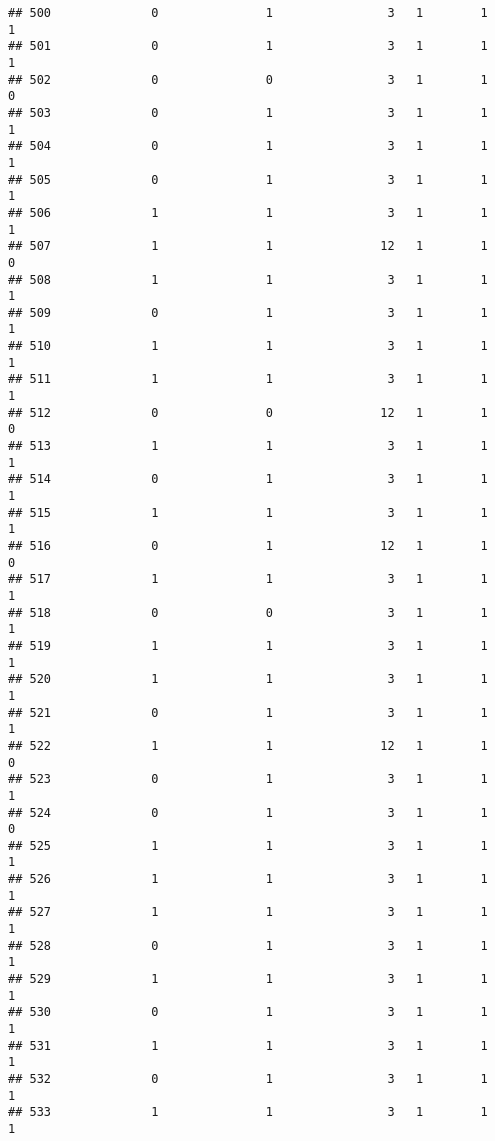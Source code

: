 \documentclass[]{article}
\begin{document}
\begin{verbatim}
## 500              0               1                3   1        1        1
## 501              0               1                3   1        1        1
## 502              0               0                3   1        1        0
## 503              0               1                3   1        1        1
## 504              0               1                3   1        1        1
## 505              0               1                3   1        1        1
## 506              1               1                3   1        1        1
## 507              1               1               12   1        1        0
## 508              1               1                3   1        1        1
## 509              0               1                3   1        1        1
## 510              1               1                3   1        1        1
## 511              1               1                3   1        1        1
## 512              0               0               12   1        1        0
## 513              1               1                3   1        1        1
## 514              0               1                3   1        1        1
## 515              1               1                3   1        1        1
## 516              0               1               12   1        1        0
## 517              1               1                3   1        1        1
## 518              0               0                3   1        1        1
## 519              1               1                3   1        1        1
## 520              1               1                3   1        1        1
## 521              0               1                3   1        1        1
## 522              1               1               12   1        1        0
## 523              0               1                3   1        1        1
## 524              0               1                3   1        1        0
## 525              1               1                3   1        1        1
## 526              1               1                3   1        1        1
## 527              1               1                3   1        1        1
## 528              0               1                3   1        1        1
## 529              1               1                3   1        1        1
## 530              0               1                3   1        1        1
## 531              1               1                3   1        1        1
## 532              0               1                3   1        1        1
## 533              1               1                3   1        1        1

\end{verbatim}
\end{document}
